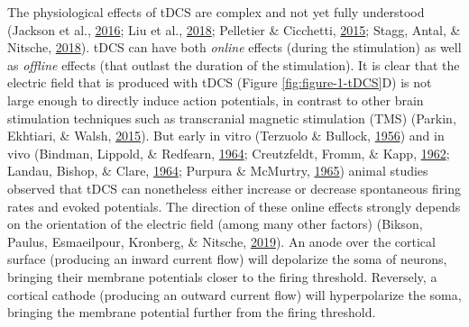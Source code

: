 \documentclass[12pt,a4paper,oldfontcommands]{memoir}
\begin{document}
The physiological effects of tDCS are complex and not yet fully understood (Jackson et al., \protect\hyperlink{ref-Jackson2016}{2016}; Liu et al., \protect\hyperlink{ref-Liu2018}{2018}; Pelletier \& Cicchetti, \protect\hyperlink{ref-Pelletier2015}{2015}; Stagg, Antal, \& Nitsche, \protect\hyperlink{ref-Stagg2018}{2018}). tDCS can have both \emph{online} effects (during the stimulation) as well as \emph{offline} effects (that outlast the duration of the stimulation). It is clear that the electric field that is produced with tDCS (Figure \ref{fig:figure-1-tDCS}D) is not large enough to directly induce action potentials, in contrast to other brain stimulation techniques such as transcranial magnetic stimulation (TMS) (Parkin, Ekhtiari, \& Walsh, \protect\hyperlink{ref-Parkin2015}{2015}). But early in vitro (Terzuolo \& Bullock, \protect\hyperlink{ref-Terzuolo1956}{1956}) and in vivo (Bindman, Lippold, \& Redfearn, \protect\hyperlink{ref-Bindman1964}{1964}; Creutzfeldt, Fromm, \& Kapp, \protect\hyperlink{ref-Creutzfeldt1962}{1962}; Landau, Bishop, \& Clare, \protect\hyperlink{ref-Landau1964}{1964}; Purpura \& McMurtry, \protect\hyperlink{ref-Purpura1965}{1965}) animal studies observed that tDCS can nonetheless either increase or decrease spontaneous firing rates and evoked potentials. The direction of these online effects strongly depends on the orientation of the electric field (among many other factors) (Bikson, Paulus, Esmaeilpour, Kronberg, \& Nitsche, \protect\hyperlink{ref-Bikson2019}{2019}). An anode over the cortical surface (producing an inward current flow) will depolarize the soma of neurons, bringing their membrane potentials closer to the firing threshold. Reversely, a cortical cathode (producing an outward current flow) will hyperpolarize the soma, bringing the membrane potential further from the firing threshold.
\end{document}
